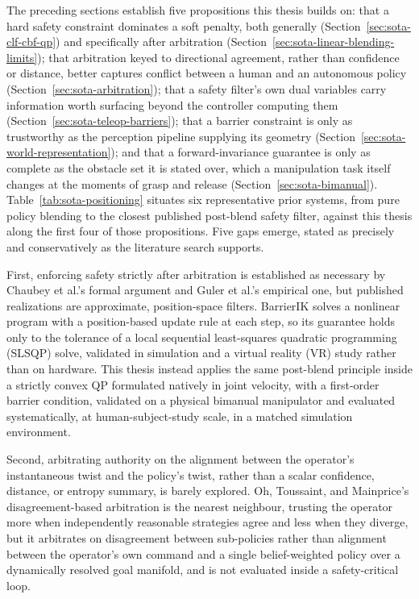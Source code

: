 \documentclass[12pt,a4paper,twoside,openright]{report}
\begin{document}
The preceding sections establish five propositions this thesis builds on: that a hard safety constraint dominates a soft penalty, both generally (Section~\ref{sec:sota-clf-cbf-qp}) and specifically after arbitration (Section~\ref{sec:sota-linear-blending-limits}); that arbitration keyed to directional agreement, rather than confidence or distance, better captures conflict between a human and an autonomous policy (Section~\ref{sec:sota-arbitration}); that a safety filter's own dual variables carry information worth surfacing beyond the controller computing them (Section~\ref{sec:sota-teleop-barriers}); that a barrier constraint is only as trustworthy as the perception pipeline supplying its geometry (Section~\ref{sec:sota-world-representation}); and that a forward-invariance guarantee is only as complete as the obstacle set it is stated over, which a manipulation task itself changes at the moments of grasp and release (Section~\ref{sec:sota-bimanual}). Table~\ref{tab:sota-positioning} situates six representative prior systems, from pure policy blending to the closest published post-blend safety filter, against this thesis along the first four of those propositions. Five gaps emerge, stated as precisely and conservatively as the literature search supports.

First, enforcing safety strictly after arbitration is established as necessary by Chaubey et al.'s formal argument and Guler et al.'s empirical one, but published realizations are approximate, position-space filters. BarrierIK solves a nonlinear program with a position-based update rule at each step, so its guarantee holds only to the tolerance of a local sequential least-squares quadratic programming (SLSQP) solve, validated in simulation and a virtual reality (VR) study rather than on hardware. This thesis instead applies the same post-blend principle inside a strictly convex QP formulated natively in joint velocity, with a first-order barrier condition, validated on a physical bimanual manipulator and evaluated systematically, at human-subject-study scale, in a matched simulation environment.

Second, arbitrating authority on the alignment between the operator's instantaneous twist and the policy's twist, rather than a scalar confidence, distance, or entropy summary, is barely explored. Oh, Toussaint, and Mainprice's disagreement-based arbitration is the nearest neighbour, trusting the operator more when independently reasonable strategies agree and less when they diverge, but it arbitrates on disagreement between sub-policies rather than alignment between the operator's own command and a single belief-weighted policy over a dynamically resolved goal manifold, and is not evaluated inside a safety-critical loop.
\end{document}
